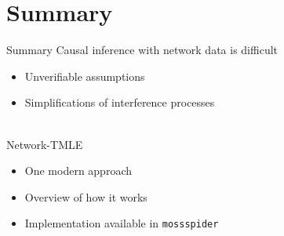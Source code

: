 \documentclass{beamer}
\begin{document}
\section{Summary}

\begin{frame}{Summary}
	Causal inference with network data is difficult
	\begin{itemize}
		\item Unverifiable assumptions
		\item Simplifications of interference processes
	\end{itemize}~\\
	Network-TMLE
	\begin{itemize}
		\item One modern approach 
		\item Overview of how it works
		\item Implementation available in \texttt{mossspider}
	\end{itemize}
\end{frame}
\end{document}
